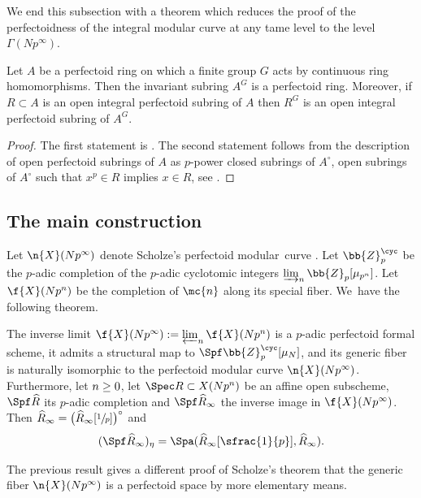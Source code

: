 We end this subsection with a theorem which reduces the proof of the perfectoidness of the integral modular curve at any tame level to the level $\Gamma(Np^\infty)$.

\begin{theo}
\label{theoinvperf}
Let $A$ be a perfectoid ring on which a finite group $G$ acts by continuous ring homomorphisms. Then the invariant subring $A^G$ is a perfectoid ring. Moreover, if $R\subset A$ is an open integral perfectoid subring of $A$ then $R^G$ is an open integral perfectoid subring of $A^G$.
\end{theo}

\begin{proof}
The first statement is \cite[Th.\,3.3.26]{kedlaya2016relative}. The second statement follows from the description of open perfectoid subrings of $A$ as $p$-power closed subrings of $A^\circ$, \ie open subrings of $A^\circ$ such that $x^p \in R$ implies $x\in R$, see \cite[Cor.\,2.2]{MorrowFoundPerfectoid}.
\end{proof}

\subsection*{The main construction}

Let $\n{X}(Np^\infty)$ denote Scholze's perfectoid modular~curve \cite{scholzeTorsCoho2015}. Let $\bb{Z}_p^{\cyc}$ be the $p$-adic completion of the $p$-adic cyclotomic integers $\varinjlim_n \bb{Z}_p[\mu_{p^n}]$. Let $\f{X}(Np^n)$ be the completion of $\mc{n}$ along its special fiber. We~have the following theorem.

\begin{theo}
\label{theoexistperfint}
The inverse limit $\f{X}(Np^\infty):=\varprojlim_{n} \f{X}(Np^n)$ is a $p$-adic perfectoid formal scheme, it admits a structural map to $\Spf \bb{Z}_p^{\cyc}[\mu_{N}]$, and its generic fiber is naturally isomorphic to the perfectoid modular curve $\n{X}(Np^\infty)$. Furthermore, let $n\geq\nobreak 0$, let $\Spec R \subset X(Np^n)$ be an affine open subscheme, $\Spf \widehat{R}$ its $p$-adic completion and $\Spf \widehat{R}_{\infty}$ the inverse image in $\f{X}(Np^\infty)$. Then $\widehat{R}_{\infty}= \bigl(\widehat{R}_{\infty}[\sfrac{1}{p}]\bigr)^{\circ}$ and
\[
(\Spf \widehat{R}_{\infty})_{\eta}= \Spa(\widehat{R}_{\infty}[\sfrac{1}{p}], \widehat{R}_{\infty}).
\]
\end{theo}

\begin{remark}
The previous result gives a different proof of Scholze's theorem that the generic fiber $\n{X}(Np^\infty)$ is a perfectoid space by more elementary means.
\end{remark}

